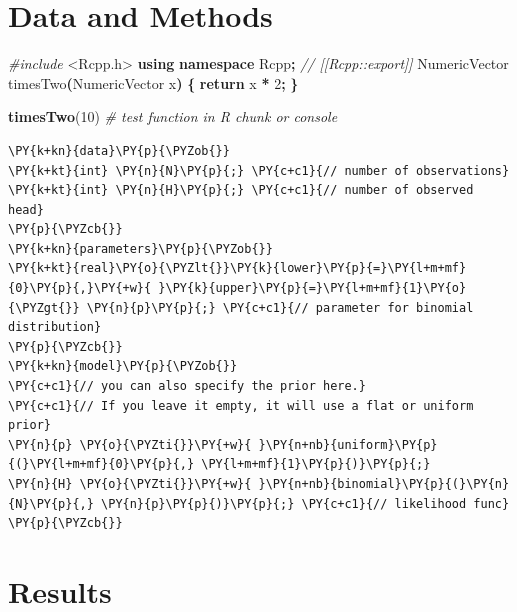 \documentclass[
]{article}
\newenvironment{Shaded}{\begin{snugshade}}{\end{snugshade}}
\newcommand{\CommentTok}[1]{\textcolor[rgb]{0.56,0.35,0.01}{\textit{#1}}}
\newcommand{\ControlFlowTok}[1]{\textcolor[rgb]{0.13,0.29,0.53}{\textbf{#1}}}
\newcommand{\DecValTok}[1]{\textcolor[rgb]{0.00,0.00,0.81}{#1}}
\newcommand{\FunctionTok}[1]{\textcolor[rgb]{0.13,0.29,0.53}{\textbf{#1}}}
\newcommand{\ImportTok}[1]{#1}
\newcommand{\KeywordTok}[1]{\textcolor[rgb]{0.13,0.29,0.53}{\textbf{#1}}}
\newcommand{\NormalTok}[1]{#1}
\newcommand{\OperatorTok}[1]{\textcolor[rgb]{0.81,0.36,0.00}{\textbf{#1}}}
\newcommand{\PreprocessorTok}[1]{\textcolor[rgb]{0.56,0.35,0.01}{\textit{#1}}}
\begin{document}
\section{Data and Methods}\label{sec:data-method}

\begin{Shaded}
\begin{Highlighting}[]
\PreprocessorTok{\#include }\ImportTok{\textless{}Rcpp.h\textgreater{}}
\KeywordTok{using} \KeywordTok{namespace}\NormalTok{ Rcpp}\OperatorTok{;}
\CommentTok{// [[Rcpp::export]]}
\NormalTok{NumericVector timesTwo}\OperatorTok{(}\NormalTok{NumericVector x}\OperatorTok{)} \OperatorTok{\{}
  \ControlFlowTok{return}\NormalTok{ x }\OperatorTok{*} \DecValTok{2}\OperatorTok{;}
\OperatorTok{\}}
\end{Highlighting}
\end{Shaded}

\begin{Shaded}
\begin{Highlighting}[]
\FunctionTok{timesTwo}\NormalTok{(}\DecValTok{10}\NormalTok{) }\CommentTok{\# test function in R chunk or console}
\end{Highlighting}
\end{Shaded}

\begin{Shaded}
\begin{Verbatim}[commandchars=\\\{\}]
\PY{k+kn}{data}\PY{p}{\PYZob{}}
\PY{k+kt}{int} \PY{n}{N}\PY{p}{;} \PY{c+c1}{// number of observations}
\PY{k+kt}{int} \PY{n}{H}\PY{p}{;} \PY{c+c1}{// number of observed head}
\PY{p}{\PYZcb{}}
\PY{k+kn}{parameters}\PY{p}{\PYZob{}}
\PY{k+kt}{real}\PY{o}{\PYZlt{}}\PY{k}{lower}\PY{p}{=}\PY{l+m+mf}{0}\PY{p}{,}\PY{+w}{ }\PY{k}{upper}\PY{p}{=}\PY{l+m+mf}{1}\PY{o}{\PYZgt{}} \PY{n}{p}\PY{p}{;} \PY{c+c1}{// parameter for binomial distribution}
\PY{p}{\PYZcb{}}
\PY{k+kn}{model}\PY{p}{\PYZob{}}
\PY{c+c1}{// you can also specify the prior here.}
\PY{c+c1}{// If you leave it empty, it will use a flat or uniform prior}
\PY{n}{p} \PY{o}{\PYZti{}}\PY{+w}{ }\PY{n+nb}{uniform}\PY{p}{(}\PY{l+m+mf}{0}\PY{p}{,} \PY{l+m+mf}{1}\PY{p}{)}\PY{p}{;}
\PY{n}{H} \PY{o}{\PYZti{}}\PY{+w}{ }\PY{n+nb}{binomial}\PY{p}{(}\PY{n}{N}\PY{p}{,} \PY{n}{p}\PY{p}{)}\PY{p}{;} \PY{c+c1}{// likelihood func}
\PY{p}{\PYZcb{}}
\end{Verbatim}
\end{Shaded}

\section{Results}\label{results}
\end{document}
